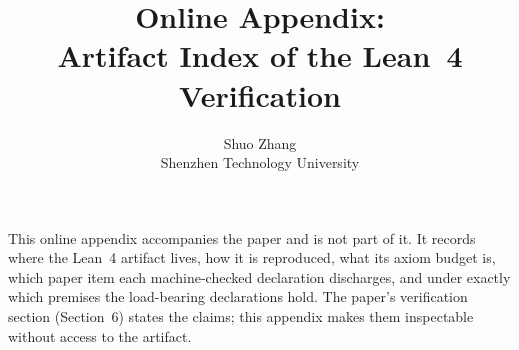 \documentclass[11pt]{article}
\title{Online Appendix:\\ Artifact Index of the Lean~4 Verification}
\author{Shuo Zhang\\ Shenzhen Technology University}
\date{}
\newcommand{\pSecVerify}{6}      %
\begin{document}
\maketitle

\noindent This online appendix accompanies the paper and is not part of it. It records where the Lean~4 artifact lives,
how it is reproduced, what its axiom budget is, which paper item each machine-checked declaration discharges, and under
exactly which premises the load-bearing declarations hold. The paper's verification section (Section~\pSecVerify) states
the claims; this appendix makes them inspectable without access to the artifact.


\end{document}
